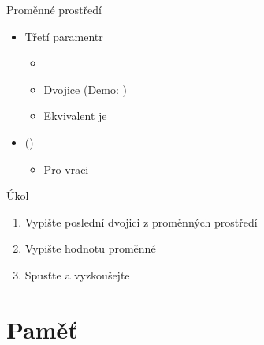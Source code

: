 \begin{frame}{Proměnné prostředí}

  \begin{itemize}
    \item Třetí paramentr 
    \begin{itemize}
      \item {}
      \item Dvojice  (Demo: )

      \pause

      \item Ekvivalent je 
    \end{itemize}

    \pause

    \item {} ()
    \begin{itemize}
      \item Pro  vraci 
    \end{itemize}
  \end{itemize}

\end{frame}

\begin{frame}{Úkol}

  \begin{enumerate}
    \item Vypište poslední dvojici z proměnných prostředí
    \item Vypište hodnotu proměnné 
    \item Spusťte a vyzkoušejte
  \end{enumerate}

\end{frame}

\section{Paměť}
\frame{\sectionpage}



